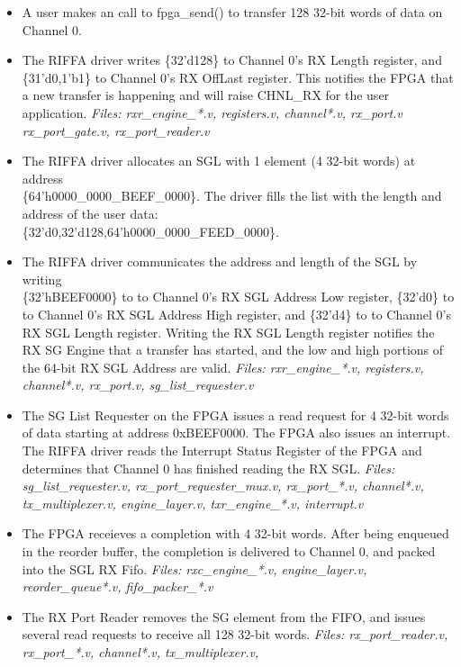 \documentclass{refrep}
\begin{document}
\begin{itemize}
 \item A user makes an call to fpga\_send() to transfer 128 32-bit words of data on Channel 0.  \item The RIFFA driver writes \{32'd128\} to Channel 0's RX Length register, and
   \{31'd0,1'b1\} to Channel 0's RX OffLast register. This notifies the FPGA that a new
   transfer is happening and will raise CHNL\_RX for the user
   application. \textit{Files: rxr\_engine\_*.v, registers.v, channel*.v,
     rx\_port.v rx\_port\_gate.v, rx\_port\_reader.v}
 \item The RIFFA driver allocates an SGL with 1 element (4 32-bit words) at
   address \\\{64'h0000\_0000\_BEEF\_0000\}. The driver fills the list with the
   length and address of the user data:\\
    \{32'd0,32'd128,64'h0000\_0000\_FEED\_0000\}.
 \item The RIFFA driver communicates the address and length of the SGL by
   writing \\\{32'hBEEF0000\} to to Channel 0's RX SGL Address Low register,
   \{32'd0\} to to Channel 0's RX SGL Address High register, and \{32'd4\} to to
   Channel 0's RX SGL Length register. Writing the RX SGL Length register
   notifies the RX SG Engine that a transfer has started, and the low and high
   portions of the 64-bit RX SGL Address are valid. \textit{Files:
     rxr\_engine\_*.v, registers.v, channel*.v, rx\_port.v,
     sg\_list\_requester.v}
 \item The SG List Requester on the FPGA issues a read request for 4 32-bit
   words of data starting at address 0xBEEF0000. The FPGA also issues an
   interrupt. The RIFFA driver reads the Interrupt Status Register of the FPGA
   and determines that Channel 0 has finished reading the RX SGL. \textit{Files:
     sg\_list\_requester.v, rx\_port\_requester\_mux.v, rx\_port\_*.v,
     channel*.v, tx\_multiplexer.v, engine\_layer.v, txr\_engine\_*.v,
     interrupt.v}
 \item The FPGA receieves a completion with 4 32-bit words. After being enqueued
   in the reorder buffer, the completion is delivered to Channel 0, and packed
   into the SGL RX Fifo. \textit{Files: rxc\_engine\_*.v, engine\_layer.v,
     reorder\_queue*.v, fifo\_packer\_*.v}
 \item The RX Port Reader removes the SG element from the FIFO, and issues
   several read requests to receive all 128 32-bit words. \textit{Files:
     rx\_port\_reader.v, rx\_port\_*.v, channel*.v, tx\_multiplexer.v,
}
\end{itemize}
\end{document}
